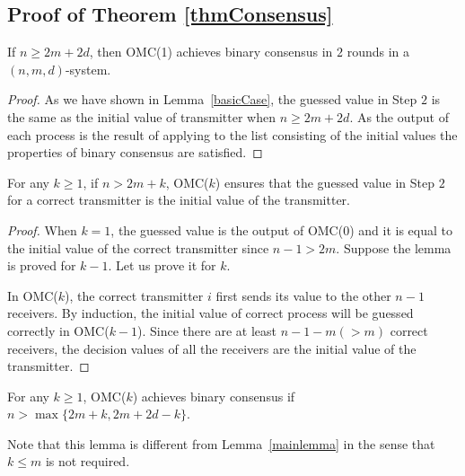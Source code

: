 \subsection{Proof of Theorem \ref{thmConsensus}}

\begin{lemma}\label{cons:2}
If $n\geqslant 2m+2d$, then  OMC(1) achieves  binary consensus in $2$ rounds in a $(n,m,d)$-system.
\end{lemma}

\begin{proof}
As we have shown in Lemma~\ref{basicCase}, the guessed value in Step $2$ 
is the same as the initial value of transmitter when $n \geqslant 2m+2d$. 
As the output of each process is the result of applying  to the list consisting of the initial values the properties of binary  consensus are satisfied.
\end{proof}

\begin{lemma}
For any $k\geqslant 1$, if $n>2m+k$, OMC($k$) ensures that the guessed value in Step $2$ for a correct transmitter is the initial value of the transmitter.
\end{lemma}

\begin{proof}
When $k=1$, the guessed value is the output of OMC(0) and  it is equal to the initial value of the correct transmitter since $n-1>2m$. Suppose the lemma is proved for $k-1$. Let us prove it for $k$.

In OMC($k$), the correct transmitter $i$ first sends its value to the other $n-1$ receivers. 
By induction, the initial value of correct process will be guessed  correctly in OMC($k-1$). 
Since there are at least $n-1-m(>m)$ correct receivers, the decision values of all the receivers are the initial value of the transmitter.
\end{proof}

\begin{lemma}\label{cons:corelemma}
  For any $k \geqslant 1$, OMC($k$) achieves binary consensus if $n>\max\{2m+k,2m+2d-k\}$.
\end{lemma}

Note that this lemma is different from Lemma~\ref{mainlemma} in the sense that $k\leqslant m$ is not required.

